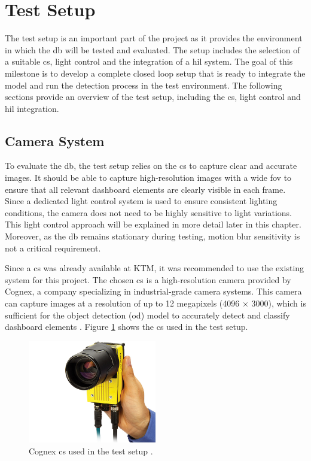 \section{Test Setup}
The test setup is an important part of the project as it provides the environment in which the \gls{db} will be tested and evaluated. The setup includes the selection of a suitable \gls{cs}, light control and the integration of a \gls{hil} system. The goal of this milestone is to develop a complete closed loop setup that is ready to integrate the model and run the detection process in the test environment. The following sections provide an overview of the test setup, including the \gls{cs}, light control and \gls{hil} integration.

\subsection{Camera System}
To evaluate the \gls{db}, the test setup relies on the \gls{cs} to capture clear and accurate images. It should be able to capture high-resolution images with a wide \gls{fov} to ensure that all relevant dashboard elements are clearly visible in each frame. Since a dedicated light control system is used to ensure consistent lighting conditions, the camera does not need to be highly sensitive to light variations. This light control approach will be explained in more detail later in this chapter. Moreover, as the \gls{db} remains stationary during testing, motion blur sensitivity is not a critical requirement.

Since a \gls{cs} was already available at KTM, it was recommended to use the existing system for this project. The chosen \gls{cs} is a high-resolution camera provided by Cognex, a company specializing in industrial-grade camera systems. This camera can capture images at a resolution of up to 12 megapixels (4096 × 3000), which is sufficient for the object detection (\gls{od}) model to accurately detect and classify dashboard elements \cite{Cognex_Camera}. Figure \ref{Cognex_Camera} shows the \gls{cs} used in the test setup.

\begin{figure}[!htb]
    \centering
    \includegraphics[width=0.5\textwidth]{Figures/In-Sight 9000 in hand.jpg}
    \caption{Cognex \gls{cs} used in the test setup \cite{Cognex_Camera}.}
    \label{Cognex_Camera}
\end{figure}

